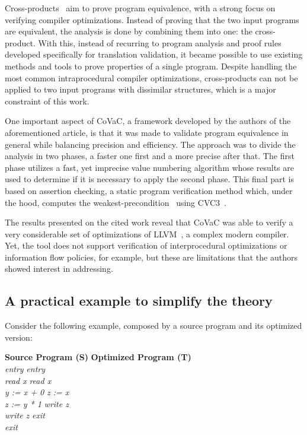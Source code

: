 Cross-products~\cite{DBLP:conf/fm/ZaksP08} aim to prove program equivalence, with a strong focus on verifying compiler optimizations.
Instead of proving that the two input programs are equivalent, the analysis is done by combining them into one: the cross-product.
With this, instead of recurring to program analysis and proof rules developed specifically for translation validation, it became possible to use existing methods and tools to prove properties of a single program. 
Despite handling the most common intraprocedural compiler optimizations, cross-products can not be applied to two input programs with dissimilar structures, which is a major constraint of this work.

One important aspect of CoVaC, a framework developed by the authors of the aforementioned article, is that it was made to validate program equivalence in general while balancing precision and efficiency.
The approach was to divide the analysis in two phases, a faster one first and a more precise after that.
The first phase utilizes a fast, yet imprecise value numbering algorithm whose results are used to determine if it is necessary to apply the second phase. 
This final part is based on assertion checking, a static program verification method which, under the hood, computes the weakest-precondition~\cite{DBLP:books/ph/Dijkstra76} using CVC3~\cite{cvc3}. 

The results presented on the cited work reveal that CoVaC was able to verify a very considerable set of optimizations of LLVM~\cite{llvm}, a complex modern compiler.
Yet, the tool does not support verification of interprocedural optimizations or information flow policies, for example, but these are limitations that the authors showed interest in addressing.


\subsection{A practical example to simplify the theory} 
\label{subsec:cross_products_ex}

Consider the following example, composed by a source program and its optimized version:

\begin{tabbing}
  \hspace{2cm}\= \textbf{Source Program (S)} \hspace{2cm} \= \textbf{Optimized Program (T)} \\ 
  \> \emph{entry} \> \emph{entry} \\
  \> \emph{  read x} \> \emph{  read x} \\
  \> \emph{  y := x + 0} \> \emph{  z := x} \\
  \> \emph{  z := y * 1} \> \emph{  write z} \\
  \> \emph{  write z} \> \emph{exit} \\
  \> \emph{exit} \> \emph{} 
  \label{tabbing:cross_products_example_code}
\end{tabbing}

